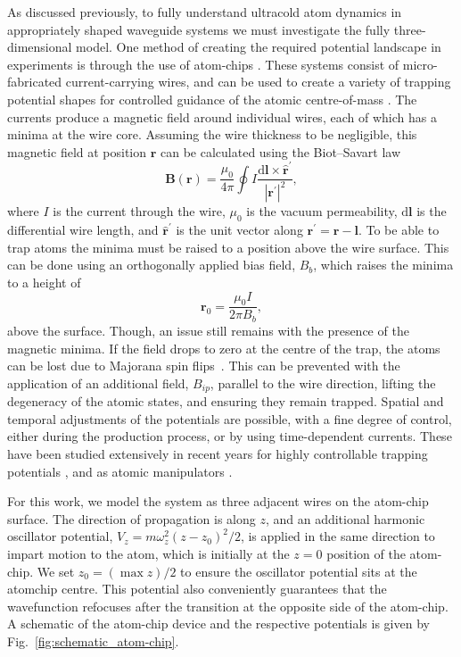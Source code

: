 As discussed previously, to fully understand ultracold atom dynamics in appropriately shaped waveguide systems we must investigate the fully three-dimensional model. One method of creating the required potential landscape in experiments is through the use of atom-chips \cite{AO:Bartenstein_ieee_2000,AO:Folman_prl_2000}. These systems consist of micro-fabricated current-carrying wires, and can be used to create a variety of trapping potential shapes for controlled guidance of the atomic centre-of-mass \cite{AO:Denschlag_prl_1999}. The currents produce a magnetic field around individual wires, each of which has a minima at the wire core. Assuming the wire thickness to be negligible, this magnetic field at position $\mathbf{r}$ can be calculated using the Biot--Savart law
\begin{equation}
    \mathbf{B}(\mathbf{r}) = \frac{\mu_0}{4\pi}\oint I \frac{\text{d}\mathbf{l}\times \hat{\mathbf{r}}^{'}}{|\mathbf{r^{'}}|^2},
\end{equation}
where $I$ is the current through the wire, $\mu_0$ is the vacuum permeability, $\text{d}\mathbf{l}$ is the differential wire length, and $\hat{\mathbf{r}}^{'}$ is the unit vector along $\mathbf{r^{'}} = \mathbf{r} - \mathbf{l}$. To be able to trap atoms the minima must be raised to a position above the wire surface. This can be done using an orthogonally applied bias field, ${B}_b$, which raises the minima to a height of
\begin{equation}
    \mathbf{r}_0 = \frac{\mu_0 I}{2\pi {B}_b},
\end{equation}
above the surface. Though, an issue still remains with the presence of the magnetic minima. If the field drops to zero at the centre of the trap, the atoms can be lost due to Majorana spin flips~\cite{AO:Brink_pra_2006}. This can be prevented with the application of an additional field, ${B}_{ip}$, parallel to the wire direction, lifting the degeneracy of the atomic states, and ensuring they remain trapped. Spatial and temporal adjustments of the potentials are possible, with a fine degree of control, either during the production process, or by using time-dependent currents. These have been studied extensively in recent years for highly controllable trapping potentials \cite{AO:Yun_optexp_2006,AO:Gallego_optlett_2009}, and as atomic manipulators \cite{AO:Bensky_qip_2011}.

For this work, we model the system as three adjacent wires on the atom-chip surface. The direction of propagation is along $z$, and an additional harmonic oscillator potential, $V_z = m\omega_z^2 (z-z_0)^2/2$, is applied in the same direction to impart motion to the atom, which is initially at the $z=0$ position of the atom-chip. We set $z_0 = (\max z)/2$ to ensure the oscillator potential sits at the atomchip centre. This potential also conveniently guarantees that the wavefunction refocuses after the transition at the opposite side of the atom-chip. A schematic of the atom-chip device and the respective potentials is given by Fig.~\ref{fig:schematic_atom-chip}.

